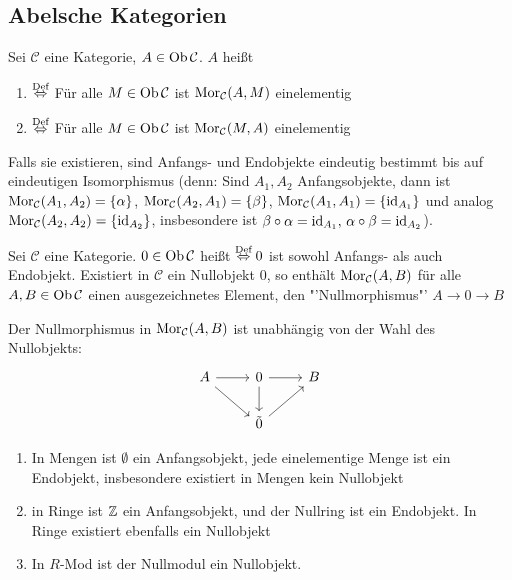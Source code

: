 \subsection{Abelsche Kategorien}
\begin{df}\label{5.1}
	Sei $\mathcal{C}$ eine Kategorie, $A\in \text{Ob}\,\mathcal{C}$. $A$ heißt
	\begin{enumerate}
		\item[]  $\overset{\text{Def}}{\Leftrightarrow}$ Für alle $M\in \text{Ob}\,\mathcal{C}$ ist $\text{Mor}_{\mathcal{C}}(A,M)$ einelementig
		\item[]  $\overset{\text{Def}}{\Leftrightarrow}$ Für alle $M\in \text{Ob}\,\mathcal{C}$ ist $\text{Mor}_{\mathcal{C}}(M,A)$ einelementig
	\end{enumerate}
\end{df}
\begin{anm}
	Falls sie existieren, sind Anfangs- und Endobjekte eindeutig bestimmt bis auf eindeutigen Isomorphismus (denn: Sind $A_1, A_2$ Anfangsobjekte, dann ist $\text{Mor}_{\mathcal{C}}(A_1, A_2) = \{\alpha\}$, $\text{Mor}_{\mathcal{C}}(A_2, A_1) = \{\beta\}$, $\text{Mor}_{\mathcal{C}}(A_1, A_1) = \{\operatorname{id}_{A_1}\}$ und analog $\text{Mor}_{\mathcal{C}}(A_2, A_2) = \{\operatorname{id}_{A_2}\}$, insbesondere ist $\beta \circ \alpha = \operatorname{id}_{A_1}, \, \alpha \circ \beta = \operatorname{id}_{A_2}$).
\end{anm}
\begin{df}\label{5.2}
	Sei $\mathcal{C}$ eine Kategorie. $0\in \text{Ob}\,\mathcal{C}$ heißt  $\overset{\text{Def}}{\Leftrightarrow} 0$ ist sowohl Anfangs- als auch Endobjekt. Existiert in $\mathcal{C}$ ein Nullobjekt $0$, so enthält $\text{Mor}_{\mathcal{C}}(A,B)$ für alle $A,B \in \text{Ob}\,\mathcal{C}$ einen ausgezeichnetes Element, den "'Nullmorphismus"' $ A \to 0 \to B$
\end{df}
\begin{anm}
	Der Nullmorphismus in $\text{Mor}_{\mathcal{C}}(A,B)$ ist unabhängig von der Wahl des Nullobjekts:
	$$\begin{tikzcd}
	A \arrow{r} \arrow{dr} & 0\arrow{d} \arrow{r} & B \\
	& \tilde{0} \arrow{ur} &
	\end{tikzcd}$$
\end{anm}
\begin{bsp}
	\begin{enumerate}[label=\alph*)]
		\item In Mengen ist $\emptyset$ ein Anfangsobjekt, jede einelementige Menge ist ein Endobjekt, insbesondere existiert in Mengen kein Nullobjekt
		\item in Ringe ist $\mathbb{Z}$ ein Anfangsobjekt, und der Nullring ist ein Endobjekt. In Ringe existiert ebenfalls ein Nullobjekt
		\item In $R$-Mod ist der Nullmodul ein Nullobjekt.
	\end{enumerate}
\end{bsp}
